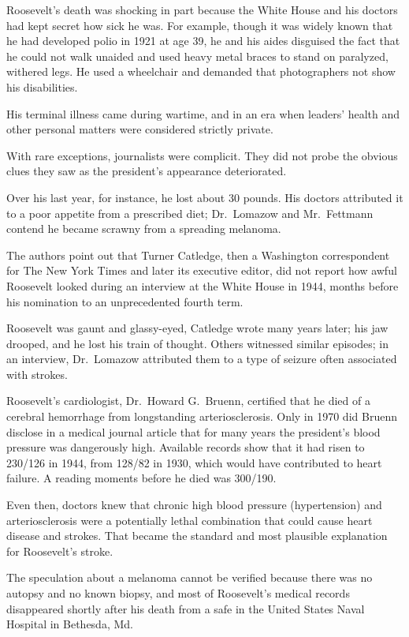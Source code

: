 ﻿\documentclass[12pt]{article}
\begin{document}
Roosevelt's death was shocking in part because the White House and his doctors had kept secret how
sick he was. For example, though it was widely known that he had developed polio in 1921 at age 39,
he and his aides disguised the fact that he could not walk unaided and used heavy metal braces to
stand on paralyzed, withered legs. He used a wheelchair and demanded that photographers not show his
disabilities.

His terminal illness came during wartime, and in an era when leaders' health and other personal
matters were considered strictly private.

With rare exceptions, journalists were complicit. They did not probe the obvious clues they saw as
the president's appearance deteriorated.

Over his last year, for instance, he lost about 30 pounds. His doctors attributed it to a poor
appetite from a prescribed diet; Dr.~Lomazow and Mr.~Fettmann contend he became scrawny from a
spreading melanoma.

The authors point out that Turner Catledge, then a Washington correspondent for The New York Times
and later its executive editor, did not report how awful Roosevelt looked during an interview at the
White House in 1944, months before his nomination to an unprecedented fourth term.

Roosevelt was gaunt and glassy-eyed, Catledge wrote many years later; his jaw drooped, and he lost
his train of thought. Others witnessed similar episodes; in an interview, Dr.~Lomazow attributed
them to a type of seizure often associated with strokes.

Roosevelt's cardiologist, Dr.~Howard G.~Bruenn, certified that he died of a cerebral hemorrhage from
longstanding arteriosclerosis. Only in 1970 did Bruenn disclose in a medical journal article that
for many years the president's blood pressure was dangerously high. Available records show that it
had risen to 230/126 in 1944, from 128/82 in 1930, which would have contributed to heart failure. A
reading moments before he died was 300/190.

Even then, doctors knew that chronic high blood pressure (hypertension) and arteriosclerosis were a
potentially lethal combination that could cause heart disease and strokes. That became the standard
and most plausible explanation for Roosevelt's stroke.

The speculation about a melanoma cannot be verified because there was no autopsy and no known
biopsy, and most of Roosevelt's medical records disappeared shortly after his death from a safe in
the United States Naval Hospital in Bethesda, Md.
\end{document}
